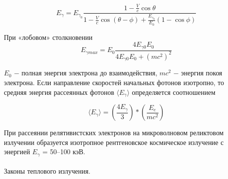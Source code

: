 \documentclass[__main__.tex]{subfiles}
\begin{document}
$$
    E_γ = E_{γ_0}\frac{1-\frac{V}{c}\cos\theta}{1-\frac{V}{c}\cos(\theta-\phi)+\frac{E_{γ_0}}{E_0}(1-\cos\phi)}
$$

При «лобовом» столкновении
$$
    E_{γmax} = E_0 \frac{4E_{γ0} E_0}{4E_{γ0} E_0 + (mc^2)^2}
$$

$E_{0}$ − полная энергия электрона до взаимодействия, $ mc^2$ − энергия покоя электрона.
Если направление скоростей начальных фотонов изотропно, то средняя энергия рассеянных фотонов  $\langle E_γ \rangle$  определяется соотношением

$$
    \langle E_γ \rangle = (\frac{4E_γ}{3})*(\frac{E_e}{mc^2})
$$

При рассеянии релятивистских электронов на микроволновом реликтовом излучении образуется изотропное рентгеновское космическое излучение с энергией
$E_γ$ = 50–100 кэВ.\\\\
Законы теплового излучения.\\
\end{document}
